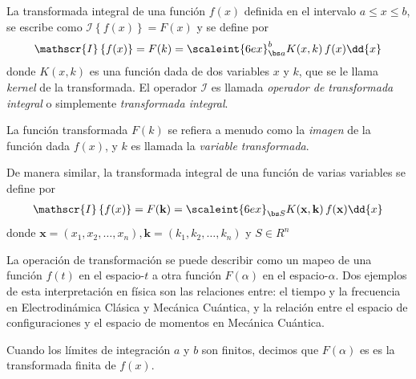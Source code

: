 La transformada integral de una función $f(x)$ definida en el intervalo $a \leq x \leq b$, se escribe como $\mathscr{I} \left\{ f(x) \right\} = F(x)$ y se define por
\begin{align}
\mathscr{I} \left\{ f(x) \right\} = F(k) = \scaleint{6ex}_{\bs a}^{b} K(x, k) \, f(x) \dd{x}
\label{eq:ecuacion_01_02_01}
\end{align}
donde $K(x, k)$ es una función dada de dos variables $x$ y $k$, que se le llama \emph{kernel} de la transformada. El operador $\mathscr{I}$ es llamada \emph{operador de transformada integral} o simplemente \emph{transformada integral}.
\par
La función transformada $F(k)$ se refiera a menudo como la \emph{imagen} de la función dada $f(x)$, y $k$ es llamada la \emph{variable transformada}.
\par
De manera similar, la transformada integral de una función de varias variables se define por
\begin{align}
\mathscr{I} \left\{ f(x) \right\} = F(\mathbf{k}) = \scaleint{6ex}_{\bs S} K(\mathbf{x}, \mathbf{k}) \, f(\mathbf{x}) \dd{x}
\label{eq:ecuacion_01_02_02}
\end{align}
donde $\mathbf{x} = (x_{1}, x_{2}, \ldots, x_{n}), \mathbf{k} = (k_{1}, k_{2}, \ldots, k_{n})$ y $S \in R^{n}$
\par
La operación de transformación se puede describir como un mapeo de una función $f(t)$ en el espacio-$t$ a otra función $F (\alpha)$ en el espacio-$\alpha$. Dos ejemplos de esta interpretación en física son las relaciones entre: el tiempo y la frecuencia en Electrodinámica Clásica y Mecánica Cuántica, y la relación entre el espacio de configuraciones y el espacio de momentos en Mecánica Cuántica.
\par
Cuando los límites de integración $a$ y $b$ son finitos, decimos que $F(\alpha)$ es es la transformada finita de $f(x)$. 

